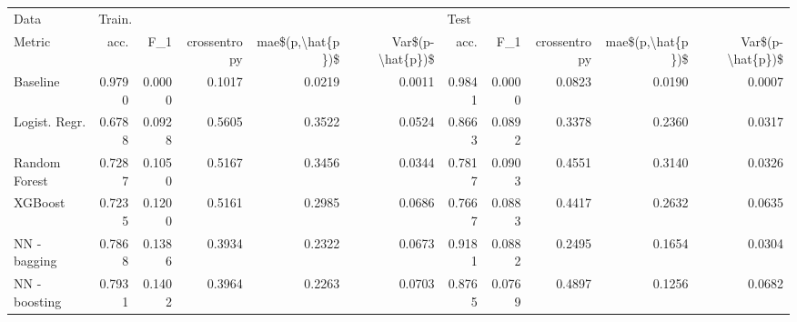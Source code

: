 \begin{tabular}{lrrrrrrrrrr}
\toprule
Data & \multicolumn{5}{l}{Train.} & \multicolumn{5}{l}{Test} \\
Metric &    acc. &     F\_1 & crossentropy & mae\$(p,\textbackslash hat\{p\})\$ & Var\$(p-\textbackslash hat\{p\})\$ &    acc. &     F\_1 & crossentropy & mae\$(p,\textbackslash hat\{p\})\$ & Var\$(p-\textbackslash hat\{p\})\$ \\
\midrule
Baseline      &  0.9790 &  0.0000 &       0.1017 &           0.0219 &           0.0011 &  0.9841 &  0.0000 &       0.0823 &           0.0190 &           0.0007 \\
Logist. Regr. &  0.6788 &  0.0928 &       0.5605 &           0.3522 &           0.0524 &  0.8663 &  0.0892 &       0.3378 &           0.2360 &           0.0317 \\
Random Forest &  0.7287 &  0.1050 &       0.5167 &           0.3456 &           0.0344 &  0.7817 &  0.0903 &       0.4551 &           0.3140 &           0.0326 \\
XGBoost       &  0.7235 &  0.1200 &       0.5161 &           0.2985 &           0.0686 &  0.7667 &  0.0883 &       0.4417 &           0.2632 &           0.0635 \\
NN - bagging  &  0.7868 &  0.1386 &       0.3934 &           0.2322 &           0.0673 &  0.9181 &  0.0882 &       0.2495 &           0.1654 &           0.0304 \\
NN - boosting &  0.7931 &  0.1402 &       0.3964 &           0.2263 &           0.0703 &  0.8765 &  0.0769 &       0.4897 &           0.1256 &           0.0682 \\
\bottomrule
\end{tabular}
